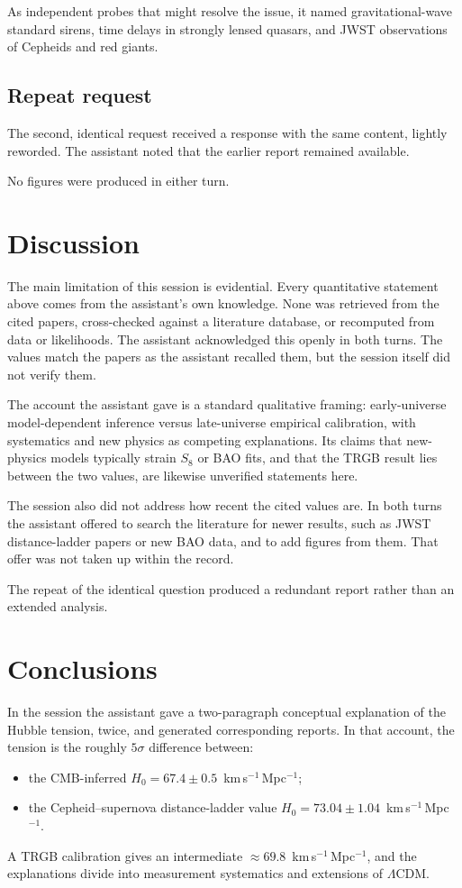 \documentclass[11pt,a4paper]{article}
\begin{document}
As independent probes that might resolve the issue, it named gravitational-wave standard sirens, time delays in strongly lensed quasars, and JWST observations of Cepheids and red giants.

\subsection{Repeat request}
The second, identical request received a response with the same content, lightly reworded. The assistant noted that the earlier report remained available.

No figures were produced in either turn.

\section{Discussion}
The main limitation of this session is evidential. Every quantitative statement above comes from the assistant's own knowledge. None was retrieved from the cited papers, cross-checked against a literature database, or recomputed from data or likelihoods. The assistant acknowledged this openly in both turns. The values match the papers as the assistant recalled them, but the session itself did not verify them.

The account the assistant gave is a standard qualitative framing: early-universe model-dependent inference versus late-universe empirical calibration, with systematics and new physics as competing explanations. Its claims that new-physics models typically strain $S_8$ or BAO fits, and that the TRGB result lies between the two values, are likewise unverified statements here.

The session also did not address how recent the cited values are. In both turns the assistant offered to search the literature for newer results, such as JWST distance-ladder papers or new BAO data, and to add figures from them. That offer was not taken up within the record.

The repeat of the identical question produced a redundant report rather than an extended analysis.

\section{Conclusions}
In the session the assistant gave a two-paragraph conceptual explanation of the Hubble tension, twice, and generated corresponding reports. In that account, the tension is the roughly $5\sigma$ difference between:
\begin{itemize}
\item the CMB-inferred $H_0 = 67.4 \pm 0.5$~km\,s$^{-1}$\,Mpc$^{-1}$;
\item the Cepheid--supernova distance-ladder value $H_0 = 73.04 \pm 1.04$~km\,s$^{-1}$\,Mpc$^{-1}$.
\end{itemize}
A TRGB calibration gives an intermediate $\approx 69.8$~km\,s$^{-1}$\,Mpc$^{-1}$, and the explanations divide into measurement systematics and extensions of $\Lambda$CDM.
\end{document}
